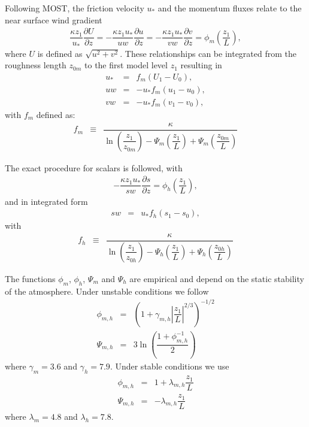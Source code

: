 \documentclass[gmd]{copernicus}
\begin{document}
Following MOST, the friction velocity $u_*$ and the momentum fluxes relate to the near surface wind gradient
\begin{eqnarray}
\dfrac{\kappa z_1}{u_*} \dfrac{\partial U}{\partial z}  = 
- \dfrac{\kappa z_1 u_*}{u w} \dfrac{\partial u}{\partial z} =
- \dfrac{\kappa z_1 u_*}{v w} \dfrac{\partial v}{\partial z} =
\phi_m \left( \dfrac{z_1}{L} \right),
\end{eqnarray}
where $U$ is defined as $\sqrt{u^2 + v^2}$. These relationships can be integrated from the roughness length $z_{0m}$ to the first model level $z_1$ resulting in 
\begin{eqnarray}
u_* & =  & f_m \left( U_1 - U_0 \right),\\
uw & = & - u_* f_m \left( u_1 - u_0 \right),\\
vw & = & - u_* f_m \left( v_1 - v_0 \right),
\end{eqnarray}
with $f_m$ defined as:
\begin{eqnarray}
f_m & \equiv & \dfrac{\kappa}
{ \ln{\left( \dfrac{z_1}{z_{0m}} \right)}
	- \varPsi_m \left( \dfrac{z_1}{L} \right)
	+ \varPsi_m \left( \dfrac{z_{0m}}{L} \right) }
\end{eqnarray}

The exact procedure for scalars is followed, with
\begin{eqnarray}
- \dfrac{\kappa z_1 u_*}{s w} \dfrac{\partial s}{\partial z} =
\phi_h \left( \dfrac{z_1}{L} \right),
\end{eqnarray}
and in integrated form
\begin{eqnarray}
sw & = & u_* f_h \left( s_1 - s_0 \right),
\end{eqnarray}
with
\begin{eqnarray}
f_h & \equiv &
\dfrac{\kappa}
{ \ln{\left( \dfrac{z_1}{z_{0h}} \right)}
	- \varPsi_h \left( \dfrac{z_1}{L} \right)
	+ \varPsi_h \left( \dfrac{z_{0h}}{L} \right) }
\end{eqnarray}

The functions $\phi_m$, $\phi_h$, $\varPsi_m$ and $\varPsi_h$ are empirical and depend on the static stability of the atmosphere. Under unstable conditions we follow \citet{Wilson2001, Wyngaard2010} 
\begin{eqnarray}
\phi_{m,h} & = & \left( 1 + \gamma_{m,h} \left| \dfrac{z_1}{L} \right|^{2/3} \right)^{-1/2}\\
\varPsi_{m,h} & = & 3 \ln{\left( \dfrac{1 + \phi_{m,h}^{-1}}{2} \right)} 
\end{eqnarray}
where $\gamma_m = 3.6$ and $\gamma_h = 7.9$. Under stable conditions we use \citet{Hogstrom1988, Wyngaard2010}
\begin{eqnarray}
\phi_{m,h} & = & 1 + \lambda_{m,h} \dfrac{z_1}{L}\\
\varPsi_{m,h} & = & - \lambda_{m,h} \dfrac{z_1}{L}
\end{eqnarray}
where $\lambda_m = 4.8$ and $\lambda_h = 7.8$.
\end{document}
